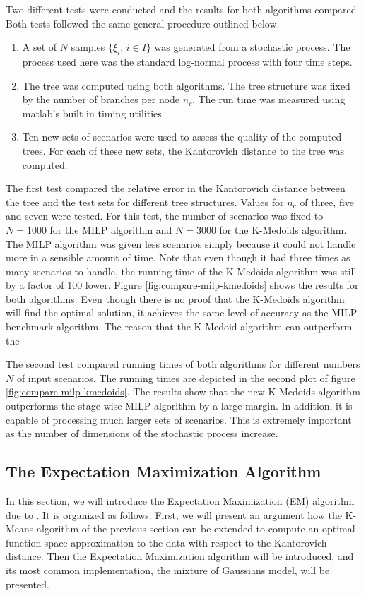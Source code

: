 Two different tests were conducted and the results for both algorithms compared. Both tests followed the same general procedure outlined below.
\begin{enumerate}
\item A set of $N$ samples $\{\xi_i,\, i\in I\}$ was generated from a stochastic process.
  The process used here was the standard log-normal process with four time steps.
\item The tree was computed using both algorithms. The tree structure was fixed by the number of branches per node $n_c$. The run time was measured using {\sc matlab}'s built in timing utilities.
\item Ten new sets of scenarios were used to assess the quality of the computed trees.
  For each of these new sets, the Kantorovich distance to the tree was computed.
\end{enumerate}

The first test compared the relative error in the Kantorovich distance between the tree and the test sets for different tree structures.
Values for $n_c$ of three, five and seven were tested.
For this test, the number of scenarios was fixed to $N=1000$ for the MILP algorithm and $N=3000$ for the K-Medoids algorithm.
The MILP algorithm was given less scenarios simply because it could not handle more in a sensible amount of time.
Note that even though it had three times as many scenarios to handle, the running time of the K-Medoids algorithm was still by a factor of 100 lower.
Figure \ref{fig:compare-milp-kmedoids} shows the results for both algorithms. Even though there is no proof that the K-Medoids algorithm will find the optimal solution, it achieves the same level of accuracy as the MILP benchmark algorithm.
The reason that the K-Medoid algorithm can outperform the 

The second test compared running times of both algorithms for different numbers $N$ of input scenarios.
The running times are depicted in the second plot of figure \ref{fig:compare-milp-kmedoids}.
The results show that the new K-Medoids algorithm outperforms the stage-wise MILP algorithm by a large margin.
In addition, it is capable of processing much larger sets of scenarios.
This is extremely important as the number of dimensions of the stochastic process increase.

\subsection{The Expectation Maximization Algorithm}
\label{sec:k-means-as-EM}
In this section, we will introduce the Expectation Maximization (EM) algorithm due to \cite{Dempster1977}.
It is organized as follows.
First, we will present an argument how the K-Means algorithm of the previous section can be extended to compute an optimal function space approximation to the data with respect to the Kantorovich distance. 
Then the Expectation Maximization algorithm will be introduced, and its most common implementation, the mixture of Gaussians model, will be presented.
